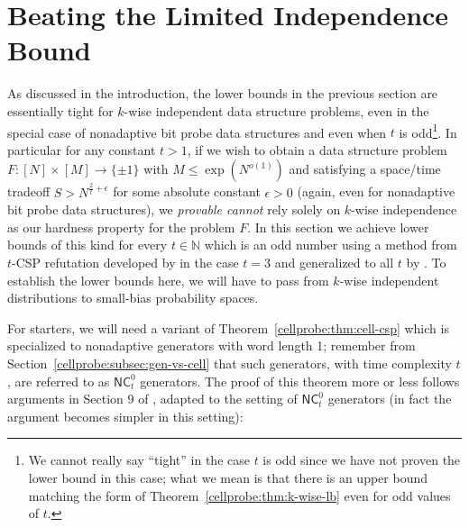 \section{Beating the Limited Independence Bound}\label{cellprobe:sec:nonadaptive-lbs}
As discussed in the introduction, the lower bounds in the previous section are essentially tight for $k$-wise independent data structure problems, even in the special case of nonadaptive bit probe data structures and even when $t$ is odd\footnote{We cannot really say ``tight'' in the case $t$ is odd since we have not proven the lower bound in this case; what we mean is that there is an upper bound matching the form of Theorem~\ref{cellprobe:thm:k-wise-lb} even for odd values of $t$.}. In particular for any constant $t > 1$, if we wish to obtain a data structure problem $F: [N] \times [M] \to \{\pm 1\}$ with $M \leq \exp(N^{o(1)})$ and satisfying a space/time tradeoff $S> N^{\frac{2}{t} + \epsilon}$ for some absolute constant $\epsilon > 0$ (again, even for nonadaptive bit probe data structures), we \emph{provable cannot} rely solely on $k$-wise independence as our hardness property for the problem $F$. In this section we achieve lower bounds of this kind for every $t \in \mathbb{N}$ which is an odd number using a method from $t$-CSP refutation developed by \cite{FKO} in the case $t=3$ and generalized to all $t$ by \cite{smoothed}. To establish the lower bounds here, we will have to pass from $k$-wise independent distributions to small-bias probability spaces. 

For starters, we will need a variant of Theorem~\ref{cellprobe:thm:cell-csp} which is specialized to nonadaptive generators with word length 1; remember from Section~\ref{cellprobe:subsec:gen-vs-cell} that such generators, with time complexity $t$, are referred to as $\mathsf{NC}^0_t$ generators. The proof of this theorem more or less follows arguments in Section 9 of \cite{smoothed}, adapted to the setting of $\mathsf{NC}^0_t$ generators (in fact the argument becomes simpler in this setting):

